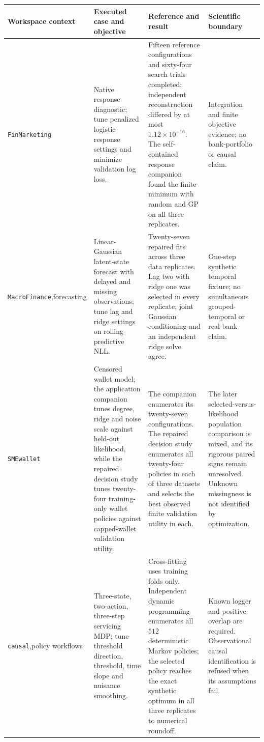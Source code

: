 \begin{longtable}{@{}p{}p{}p{}p{}@{}}
\toprule
Workspace context & Executed case and objective & Reference and result & Scientific boundary\\
\midrule
\texttt{FinMarketing} & Native response diagnostic; tune penalized logistic response settings and minimize validation log loss. & Fifteen reference configurations and sixty-four search trials completed; independent reconstruction differed by at most $1.12\times10^{-16}$. The self-contained response companion found the finite minimum with random and GP on all three replicates. & Integration and finite objective evidence; no bank-portfolio or causal claim.\\
\texttt{MacroFinance},\newline forecasting & Linear-Gaussian latent-state forecast with delayed and missing observations; tune lag and ridge settings on rolling predictive NLL. & Twenty-seven repaired fits across three data replicates. Lag two with ridge one was selected in every replicate; joint Gaussian conditioning and an independent ridge solve agree. & One-step synthetic temporal fixture; no simultaneous grouped-temporal or real-bank claim.\\
\texttt{SMEwallet} & Censored wallet model; the application companion tunes degree, ridge and noise scale against held-out likelihood, while the repaired decision study tunes twenty-four training-only wallet policies against capped-wallet validation utility. & The companion enumerates its twenty-seven configurations. The repaired decision study enumerates all twenty-four policies in each of three datasets and selects the best observed finite validation utility in each. & The later selected-versus-likelihood population comparison is mixed, and its rigorous paired signs remain unresolved. Unknown missingness is not identified by optimization.\\
\texttt{causal},\newline policy workflows & Three-state, two-action, three-step servicing MDP; tune threshold direction, threshold, time slope and nuisance smoothing. & Cross-fitting uses training folds only. Independent dynamic programming enumerates all $512$ deterministic Markov policies; the selected policy reaches the exact synthetic optimum in all three replicates to numerical roundoff. & Known logger and positive overlap are required. Observational causal identification is refused when its assumptions fail.\\

\end{longtable}
